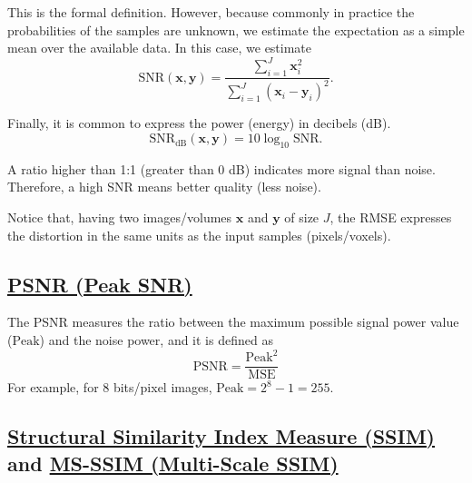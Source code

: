 \documentclass{article}
\begin{document}
This is the formal definition. However, because commonly in
practice the probabilities of the samples are unknown, we estimate the
expectation as a simple mean over the available data. In this case,
we estimate
\begin{equation}
  \text{SNR}(\mathbf{x},\mathbf{y}) = \frac{\sum_{i=1}^J\mathbf{x}_i^2}{\sum_{i=1}^J(\mathbf{x}_i - \mathbf{y}_i)^2}.
  \label{eq:estimated_SNR}
\end{equation}

Finally, it is common to express the power (energy) in decibels (dB).
\begin{equation}
  \text{SNR}_{\text{dB}}(\mathbf{x},\mathbf{y}) = 10\log_{10}\text{SNR}.
  \label{eq:estimated_SNR_in_dBs}
\end{equation}

A ratio higher than 1:1 (greater than 0 dB) indicates more signal than
noise. Therefore, a high SNR means better quality (less noise).

Notice that, having two images/volumes $\mathbf{x}$ and $\mathbf{y}$
of size $J$, the RMSE expresses the distortion in the same units as
the input samples (pixels/voxels).


\subsection{\href{https://en.wikipedia.org/wiki/Peak_signal-to-noise_ratio}{PSNR (Peak SNR)}}

The PSNR measures the ratio between the maximum possible signal power
value ($\text{Peak}$) and the noise power, and it is defined as
\begin{equation}
  \text{PSNR} = \frac{\text{Peak}^2}{\text{MSE}}
  \label{eq:PSNR}
\end{equation}
For example, for 8 bits/pixel images, $\text{Peak}=2^8-1=255$.


\subsection{\href{https://en.wikipedia.org/wiki/Structural_similarity_index_measure}{Structural
    Similarity Index Measure (SSIM)} and
  \href{https://en.wikipedia.org/wiki/Structural_similarity_index_measure\#Multi-scale_SSIM}{MS-SSIM
    (Multi-Scale SSIM)}}
\end{document}
